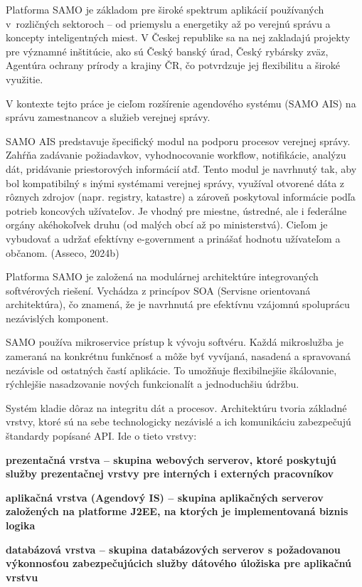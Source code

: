 Platforma SAMO je základom pre široké spektrum aplikácií používaných v~rozličných sektoroch – od priemyslu a energetiky až po verejnú správu a koncepty inteligentných miest. V Českej republike sa na nej zakladajú projekty pre významné inštitúcie, ako sú Český banský úrad, Český rybársky zväz, Agentúra ochrany prírody a krajiny ČR, čo potvrdzuje jej flexibilitu a široké využitie.


V kontexte tejto práce je cieľom rozšírenie agendového systému (SAMO AIS) na správu zamestnancov a služieb verejnej správy.

SAMO AIS predstavuje špecifický modul na podporu procesov verejnej správy. Zahŕňa zadávanie požiadavkov, vyhodnocovanie workflow, notifikácie, analýzu dát, pridávanie priestorových informácií atď. Tento modul je navrhnutý tak, aby bol kompatibilný s inými systémami verejnej správy, využíval otvorené dáta z rôznych zdrojov (napr. registry, katastre) a zároveň poskytoval informácie podľa potrieb koncových užívateľov. Je vhodný pre miestne, ústredné, ale i federálne orgány akéhokoľvek druhu (od malých obcí až po ministerstvá). Cieľom je vybudovať a udržať efektívny e-government a prinášať hodnotu užívateľom a občanom. \scr(Asseco, 2024b)

Platforma SAMO je založená na modulárnej architektúre integrovaných softvérových riešení. Vychádza z princípov SOA (Servisne orientovaná architektúra), čo znamená, že je navrhnutá pre efektívnu vzájomnú spoluprácu nezávislých komponent. %

SAMO používa mikroservice prístup k vývoju softvéru. Každá mikroslužba je zameraná na konkrétnu funkčnosť a môže byť vyvíjaná, nasadená a spravovaná nezávisle od ostatných častí aplikácie. To umožňuje flexibilnejšie škálovanie, rýchlejšie nasadzovanie nových funkcionalít a jednoduchšiu údržbu. %

Systém kladie dôraz na integritu dát a procesov. Architektúru tvoria základné vrstvy, ktoré sú na sebe technologicky nezávislé a ich komunikáciu zabezpečujú štandardy popísané API. Ide o tieto vrstvy:

\startitemize[n]
\item \start\bf prezentačná vrstva \stop -- skupina webových serverov, ktoré poskytujú služby prezentačnej vrstvy pre interných i externých pracovníkov
\item \start\bf aplikačná vrstva \stop (Agendový IS) -- skupina aplikačných serverov založených na platforme J2EE, na ktorých je implementovaná biznis logika
\item  \start\bf databázová vrstva \stop -- skupina databázových serverov s požadovanou výkonnosťou zabezpečujúcich služby dátového úložiska pre aplikačnú vrstvu
\stopitemize

